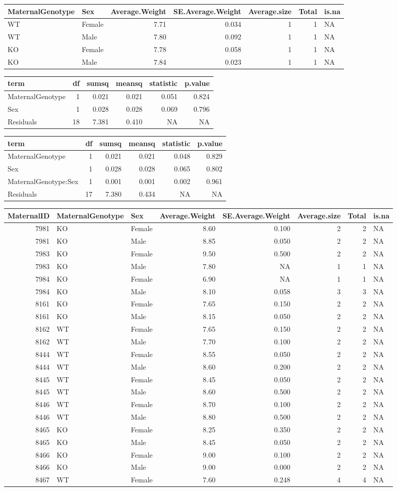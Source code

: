 \documentclass[]{article}
\begin{document}
\begin{longtable}[]{@{}llrrrrl@{}}
\toprule
MaternalGenotype & Sex & Average.Weight & SE.Average.Weight &
Average.size & Total & is.na\tabularnewline
\midrule
\endhead
WT & Female & 7.71 & 0.034 & 1 & 1 & NA\tabularnewline
WT & Male & 7.80 & 0.092 & 1 & 1 & NA\tabularnewline
KO & Female & 7.78 & 0.058 & 1 & 1 & NA\tabularnewline
KO & Male & 7.84 & 0.023 & 1 & 1 & NA\tabularnewline
\bottomrule
\end{longtable}

\begin{longtable}[]{@{}lrrrrr@{}}
\toprule
term & df & sumsq & meansq & statistic & p.value\tabularnewline
\midrule
\endhead
MaternalGenotype & 1 & 0.021 & 0.021 & 0.051 & 0.824\tabularnewline
Sex & 1 & 0.028 & 0.028 & 0.069 & 0.796\tabularnewline
Residuals & 18 & 7.381 & 0.410 & NA & NA\tabularnewline
\bottomrule
\end{longtable}

\begin{longtable}[]{@{}lrrrrr@{}}
\toprule
term & df & sumsq & meansq & statistic & p.value\tabularnewline
\midrule
\endhead
MaternalGenotype & 1 & 0.021 & 0.021 & 0.048 & 0.829\tabularnewline
Sex & 1 & 0.028 & 0.028 & 0.065 & 0.802\tabularnewline
MaternalGenotype:Sex & 1 & 0.001 & 0.001 & 0.002 & 0.961\tabularnewline
Residuals & 17 & 7.380 & 0.434 & NA & NA\tabularnewline
\bottomrule
\end{longtable}

\begin{longtable}[]{@{}rllrrrrl@{}}
\toprule
MaternalID & MaternalGenotype & Sex & Average.Weight & SE.Average.Weight
& Average.size & Total & is.na\tabularnewline
\midrule
\endhead
7981 & KO & Female & 8.60 & 0.100 & 2 & 2 & NA\tabularnewline
7981 & KO & Male & 8.85 & 0.050 & 2 & 2 & NA\tabularnewline
7983 & KO & Female & 9.50 & 0.500 & 2 & 2 & NA\tabularnewline
7983 & KO & Male & 7.80 & NA & 1 & 1 & NA\tabularnewline
7984 & KO & Female & 6.90 & NA & 1 & 1 & NA\tabularnewline
7984 & KO & Male & 8.10 & 0.058 & 3 & 3 & NA\tabularnewline
8161 & KO & Female & 7.65 & 0.150 & 2 & 2 & NA\tabularnewline
8161 & KO & Male & 8.15 & 0.050 & 2 & 2 & NA\tabularnewline
8162 & WT & Female & 7.65 & 0.150 & 2 & 2 & NA\tabularnewline
8162 & WT & Male & 7.70 & 0.100 & 2 & 2 & NA\tabularnewline
8444 & WT & Female & 8.55 & 0.050 & 2 & 2 & NA\tabularnewline
8444 & WT & Male & 8.60 & 0.200 & 2 & 2 & NA\tabularnewline
8445 & WT & Female & 8.45 & 0.050 & 2 & 2 & NA\tabularnewline
8445 & WT & Male & 8.60 & 0.500 & 2 & 2 & NA\tabularnewline
8446 & WT & Female & 8.70 & 0.100 & 2 & 2 & NA\tabularnewline
8446 & WT & Male & 8.80 & 0.500 & 2 & 2 & NA\tabularnewline
8465 & KO & Female & 8.25 & 0.350 & 2 & 2 & NA\tabularnewline
8465 & KO & Male & 8.45 & 0.050 & 2 & 2 & NA\tabularnewline
8466 & KO & Female & 9.00 & 0.100 & 2 & 2 & NA\tabularnewline
8466 & KO & Male & 9.00 & 0.000 & 2 & 2 & NA\tabularnewline
8467 & WT & Female & 7.60 & 0.248 & 4 & 4 & NA\tabularnewline
\bottomrule
\end{longtable}
\end{document}
